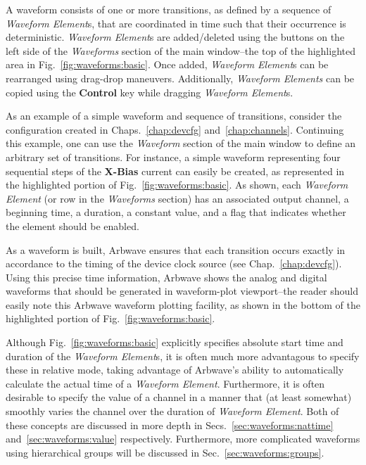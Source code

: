 A waveform consists of one or more transitions, as defined by a sequence of
\textit{Waveform Element}s, that are coordinated in time such that their
occurrence is deterministic.  \textit{Waveform Element}s are added/deleted using
the buttons on the left side of the \textit{Waveforms} section of the main
window--the top of the highlighted area in Fig.~\ref{fig:waveforms:basic}.  Once
added, \textit{Waveform Element}s can be rearranged using drag-drop maneuvers.
Additionally, \textit{Waveform Elements} can be copied using the
\textbf{Control} key while dragging \textit{Waveform Element}s.

As an example of a simple waveform and sequence of transitions, consider the
configuration created
in Chaps.~\ref{chap:devcfg} and~\ref{chap:channels}.  Continuing this example,
one can use the \textit{Waveform} section of the main window to define an
arbitrary set of transitions.  For instance, a simple waveform representing four
sequential steps of the \textbf{X-Bias} current can easily be created, as
represented in the highlighted portion of Fig.~\ref{fig:waveforms:basic}.  As
shown, each \textit{Waveform Element} (or row in the \textit{Waveforms} section)
has an associated output channel, a beginning time, a duration, a constant
value, and a flag that indicates whether the element should be enabled.

As a waveform is built, Arbwave ensures that each transition occurs exactly in
accordance to the timing of the device clock source (see
Chap.~\ref{chap:devcfg}).  Using this precise time information, Arbwave shows
the analog and digital waveforms that should be generated in waveform-plot
viewport--the reader should easily note this Arbwave waveform plotting facility,
as shown in the bottom of the highlighted portion of
Fig.~\ref{fig:waveforms:basic}.

Although Fig.~\ref{fig:waveforms:basic} explicitly specifies absolute start time
and duration of the \textit{Waveform Element}s, it is often much more
advantagous to specify these in relative mode, taking advantage of Arbwave's
ability to automatically calculate the actual time of a \textit{Waveform
Element}.  Furthermore, it is often desirable to specify the value of a channel
in a manner that (at least somewhat) smoothly varies the channel over the
duration of \textit{Waveform Element}.  Both of these concepts are discussed in
more depth in Secs.~\ref{sec:waveforms:nattime} and~\ref{sec:waveforms:value}
respectively.  Furthermore, more complicated waveforms using hierarchical groups
will be discussed in Sec.~\ref{sec:waveforms:groups}.



